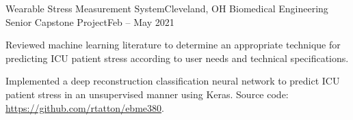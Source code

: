 \begin{ritemize}
{Wearable Stress Measurement System}{Cleveland, OH}
{Biomedical Engineering Senior Capstone Project}{Feb -- May 2021}
	\item Reviewed machine learning literature to determine an appropriate technique for predicting ICU patient stress according to user needs and technical specifications.
	\item Implemented a deep reconstruction classification neural network to predict ICU patient stress in an unsupervised manner using Keras. Source code: \url{https://github.com/rtatton/ebme380}.
\end{ritemize}